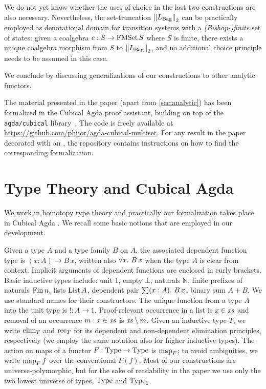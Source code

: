 \documentclass[final,a4paper,USenglish,cleveref]{lipics-v2021}
\begin{document}
We do not yet know whether the uses of choice in the last two constructions are also necessary. Nevertheless, the set-truncation $\SetTrunc{\Lim{\Bag}}$ can be practically employed as denotational domain for transition systems with a \emph{(Bishop-)finite} set of states: given a coalgebra $c : S \to \FMSet S$ where $S$ is finite, there exists a unique coalgebra morphism from $S$ to $\SetTrunc{\Lim{\Bag}}$, and no additional choice principle needs to be assumed in this case. 

We conclude by discussing generalizations of our constructions to other analytic functors.

The material presented in the paper (apart from \cref{sec:analytic}) has been formalized in the Cubical Agda proof assistant,
building on top of the {\texttt{agda/cubical}} library~\cite{AgdaCubical2018}.
The code is freely available at \url{https://github.com/phijor/agda-cubical-multiset}.
For any result in the paper decorated with an ,
the repository contains instructions on how to find the corresponding formalization.

\section{Type Theory and Cubical Agda}

We work in homotopy type theory \cite{HoTTBook} and practically our formalization takes place in Cubical Agda \cite{Vezzosi2019}. We recall some basic notions that are employed in our development.

Given a type $A$ and a type family $B$ on $A$, the associated dependent function type is $(x : A) \to B \, x$, written also $\forall x \mathpunct{.}\, B\,x$ when the type $A$ is clear from context. Implicit arguments of dependent functions are enclosed in curly brackets. Basic inductive types include: unit $1$, empty $\bot$, naturals $ℕ$, finite prefixes of naturals $\Fin n$, lists $\List A$, dependent pair $\sum (x : A) \mathpunct{.}\, B \, x$, binary sum $A + B$. We use standard names for their constructors. The unique function from a type $A$ into the unit type is $! : A \to 1$.
Proof-relevant occurrence in a list is $x \in \mathit{xs}$ and removal of an occurrence $m : x \in \mathit{xs}$ is $\mathit{xs} \setminus m$. Given an inductive type $T$, we write $\Elim{T}$ and $\Rec{T}$ for its dependent and non-dependent elimination  principles, respectively (we employ the same notation also for higher inductive types).
The action on maps of a functor $F : \Type \to \Type$ is $\Map{F}$;
to avoid ambiguities, we write $\Map{F} f$ over the conventional $F(f)$.
Most of our constructions are universe-polymorphic, but for the sake of readability in the paper we use only the two lowest universe of types, $\Type$ and $\Type_1$.
\end{document}
